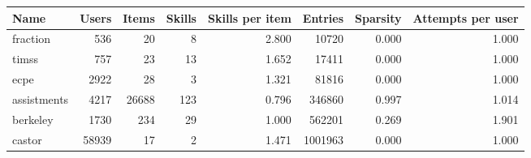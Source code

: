 \begin{tabular}{lrrrrrrr}
\toprule
        Name &  Users &  Items &  Skills &  Skills per item &  Entries &  Sparsity &  Attempts per user \\
\midrule
    fraction &    536 &     20 &       8 &            2.800 &    10720 &                  0.000 &              1.000 \\
   timss &    757 &     23 &      13 &            1.652 &    17411 &                  0.000 &              1.000 \\
        ecpe &   2922 &     28 &       3 &            1.321 &    81816 &                  0.000 &              1.000 \\
 assistments &   4217 &  26688 &     123 &            0.796 &   346860 &                  0.997 &              1.014 \\
    berkeley &   1730 &    234 &      29 &            1.000 &   562201 &                  0.269 &              1.901 \\
    castor &  58939 &     17 &       2 &            1.471 &  1001963 &                  0.000 &              1.000 \\
\bottomrule
\end{tabular}
